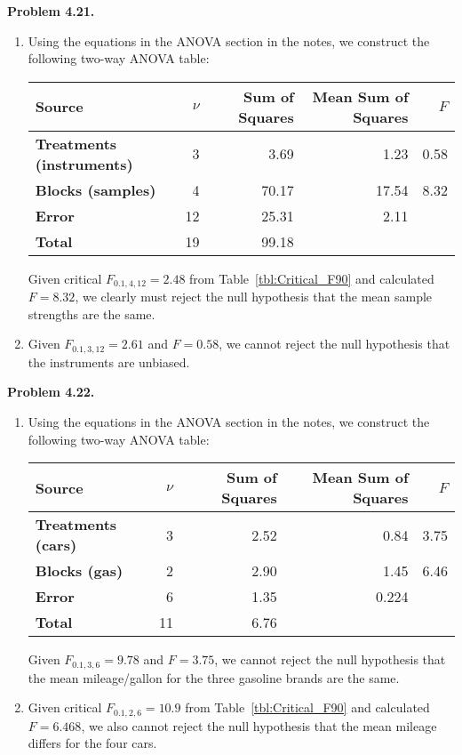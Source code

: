 \noindent
\bf{Problem 4.21.} \\

\begin{enumerate}[label=\alph*)]
\item Using the equations in the ANOVA section in the notes, we construct the following two-way ANOVA table:
\begin{table}[H]
\centering
\begin{tabular}{|l|r|r|r|r|} \hline
\bf{Source} & $\nu$ & \bf{Sum of Squares} & \bf{Mean Sum of Squares} & $F$ \\ \hline
\bf{Treatments (instruments)} & 3 & 3.69 & 1.23 &  0.58 \\ \hline
\bf{Blocks (samples)} & 4 & 70.17 & 17.54 &  8.32 \\ \hline
\bf{Error} & 12 & 25.31 & 2.11 &  \\ \hline
\bf{Total} & 19 & 99.18 &  &  \\ \hline
\end{tabular}
\end{table}
Given critical $F_{0.1,4,12} = 2.48$ from Table~\ref{tbl:Critical_F90} and calculated $F = 8.32$,
we clearly must reject the null hypothesis that the mean
sample strengths are the same. 
\item  Given $F_{0.1,3,12} = 2.61$ and $F = 0.58$, we
cannot reject the null hypothesis that the instruments are unbiased.
\end{enumerate}


\noindent
\bf{Problem 4.22.} \\
\begin{enumerate}[label=\alph*)]
\item Using the equations in the ANOVA section in the notes, we construct the following two-way ANOVA table:
\begin{table}[H]
\centering
\begin{tabular}{|l|r|r|r|r|} \hline
\bf{Source} & $\nu$ & \bf{Sum of Squares} & \bf{Mean Sum of Squares} & $F$ \\ \hline
\bf{Treatments (cars)} & 3 & 2.52 & 0.84 &  3.75 \\ \hline
\bf{Blocks (gas)} & 2 & 2.90 & 1.45 &  6.46 \\ \hline
\bf{Error} & 6 & 1.35 & 0.224 &  \\ \hline
\bf{Total} & 11 & 6.76 &  &  \\ \hline
\end{tabular}
\end{table}
Given $F_{0.1,3,6} = 9.78$ and $F = 3.75$, we cannot reject the null hypothesis that
the mean mileage/gallon for the three gasoline brands are the same. 
\item  Given critical $F_{0.1,2,6} = 10.9$ from Table~\ref{tbl:Critical_F90} and calculated $F = 6.468$, we also
cannot reject the null hypothesis that the mean mileage differs for the four cars.
\end{enumerate}



